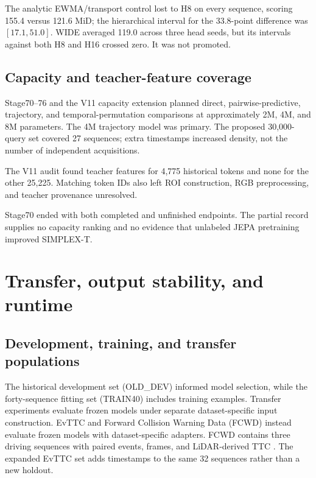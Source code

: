 The analytic EWMA/transport control lost to H8 on every sequence, scoring 155.4 versus 121.6 MiD; the hierarchical interval for the 33.8-point difference was $[17.1,51.0]$. WIDE averaged 119.0 across three head seeds, but its intervals against both H8 and H16 crossed zero. It was not promoted. 

\subsection{Capacity and teacher-feature coverage}

Stage70--76 and the V11 capacity extension planned direct, pairwise-predictive, trajectory, and temporal-permutation comparisons at approximately 2M, 4M, and 8M parameters. The 4M trajectory model was primary. The proposed 30,000-query set covered 27 sequences; extra timestamps increased density, not the number of independent acquisitions.

The V11 audit found teacher features for 4,775 historical tokens and none for the other 25,225. Matching token IDs also left ROI construction, RGB preprocessing, and teacher provenance unresolved.

Stage70 ended with both completed and unfinished endpoints. The partial record supplies no capacity ranking and no evidence that unlabeled JEPA pretraining improved SIMPLEX-T. 

\section{Transfer, output stability, and runtime}
\label{sec:transfer-context}

\subsection{Development, training, and transfer populations}

The historical development set (OLD\_DEV) informed model selection, while the forty-sequence fitting set (TRAIN40) includes training examples. Transfer experiments evaluate frozen models under separate dataset-specific input construction. EvTTC and Forward Collision Warning Data (FCWD) instead evaluate frozen models with dataset-specific adapters. FCWD contains three driving sequences with paired events, frames, and LiDAR-derived TTC \citep{eventaided}. The expanded EvTTC set adds timestamps to the same 32 sequences rather than a new holdout.

